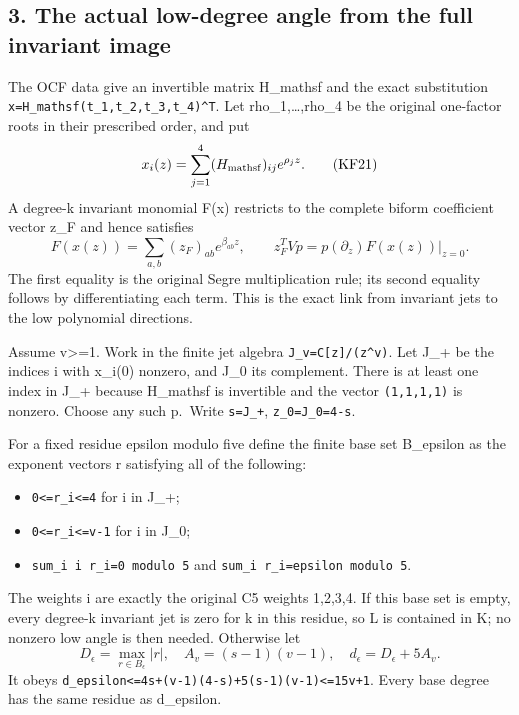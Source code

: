 \documentclass[11pt]{article}
\providecommand{\tightlist}{}
\begin{document}
\subsection{3. The actual low-degree angle from the full invariant image}\label{the-actual-low-degree-angle-from-the-full-invariant-image}

The OCF data give an invertible matrix H\_mathsf and the exact substitution \nolinkurl{x=H_mathsf(t_1,t_2,t_3,t_4)^T}. Let rho\_1,\ldots,rho\_4 be the original one-factor roots in their prescribed order, and put \[
x_i(z)=\sum_{j=1}^4(H_{\rm mathsf})_{ij}e^{\rho_jz}.
\tag{KF21}
\] A degree-k invariant monomial F(x) restricts to the complete biform coefficient vector z\_F and hence satisfies \[
F(x(z))=\sum_{a,b}(z_F)_{ab}e^{\beta_{ab}z},\qquad
z_F^TVp=\left.p(\partial_z)F(x(z))\right|_{z=0}.
\tag{KF22}
\] The first equality is the original Segre multiplication rule; its second equality follows by differentiating each term. This is the exact link from invariant jets to the low polynomial directions.

Assume v\textgreater=1. Work in the finite jet algebra \texttt{J\_v=C{[}z{]}/(z\^{}v)}. Let J\_+ be the indices i with x\_i(0) nonzero, and J\_0 its complement. There is at least one index in J\_+ because H\_mathsf is invertible and the vector \texttt{(1,1,1,1)} is nonzero. Choose any such p.~Write \texttt{s=\textbar{}J\_+\textbar{}}, \texttt{z\_0=\textbar{}J\_0\textbar{}=4-s}.

For a fixed residue epsilon modulo five define the finite base set B\_epsilon as the exponent vectors r satisfying all of the following:

\begin{itemize}
\tightlist
\item
  \texttt{0\textless{}=r\_i\textless{}=4} for i in J\_+;
\item
  \texttt{0\textless{}=r\_i\textless{}=v-1} for i in J\_0;
\item
  \nolinkurl{sum_i i r_i=0 modulo 5} and \nolinkurl{sum_i r_i=epsilon modulo 5}.
\end{itemize}

The weights i are exactly the original C5 weights 1,2,3,4. If this base set is empty, every degree-k invariant jet is zero for k in this residue, so L is contained in K; no nonzero low angle is then needed. Otherwise let \[
D_\epsilon=\max_{r\in B_\epsilon}|r|,\quad
A_v=(s-1)(v-1),\quad d_\epsilon=D_\epsilon+5A_v.
\tag{KF23}
\] It obeys \nolinkurl{d_epsilon<=4s+(v-1)(4-s)+5(s-1)(v-1)<=15v+1}. Every base degree has the same residue as d\_epsilon.
\end{document}
